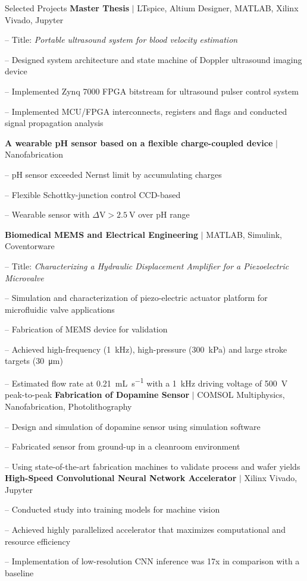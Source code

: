 
\begin{rubric}{\faTasks[solid]  Selected Projects}
\entry*[2023][]%
	\textbf{Master Thesis} $|$ LTspice, Altium Designer, MATLAB, Xilinx Vivado, Jupyter \par
	-- Title: \emph{Portable ultrasound system for blood velocity estimation} \par
	-- Designed system architecture and state machine of Doppler ultrasound imaging device \par
	-- Implemented Zynq 7000 FPGA bitstream for ultrasound pulser control system \par
	-- Implemented MCU/FPGA interconnects, registers and flags and conducted signal propagation analysis \par
%
\entry*[2023][] \textbf{A wearable pH sensor based on a flexible charge-coupled device} $|$ Nanofabrication \par
	-- pH sensor exceeded Nernst limit by accumulating charges \par
	-- Flexible Schottky-junction control CCD-based \par
	-- Wearable sensor with $\Delta \si{\volt}>\SI{2.5}{\volt}$ over pH range %

\entry*[2022][] \textbf{Biomedical MEMS and Electrical Engineering} $|$ MATLAB, Simulink, Coventorware \par
	-- Title: \emph{Characterizing a Hydraulic Displacement Amplifier for a Piezoelectric Microvalve} \par
	-- Simulation and characterization of piezo-electric actuator platform for microfluidic valve applications \par
	-- Fabrication of MEMS device for validation \par
	-- Achieved high-frequency (\SI{1}{\kilo\hertz}), high-pressure (\SI{300}{\kilo\pascal}) and large stroke targets (\SI{30}{\micro\meter}) \par
	-- Estimated flow rate at \SI{0.21}{\milli\liter\per\second} with a \SI{1}{\kilo\hertz} driving voltage of \SI{500}{\volt} peak-to-peak
%
\entry*[2021][] \textbf{Fabrication of Dopamine Sensor} $|$ COMSOL Multiphysics, Nanofabrication, Photolithography \par
	-- Design and simulation of dopamine sensor using simulation software \par
	-- Fabricated sensor from ground-up in a cleanroom environment \par
	-- Using state-of-the-art fabrication machines to validate process and wafer yields
%
\entry*[2020][] \textbf{High-Speed Convolutional Neural Network Accelerator} $|$ Xilinx Vivado, Jupyter \par
	-- Conducted study into training models for machine vision \par
	-- Achieved highly parallelized accelerator that maximizes computational and resource efficiency \par
	-- Implementation of low-resolution CNN inference was 17x in comparison with a baseline
\end{rubric}